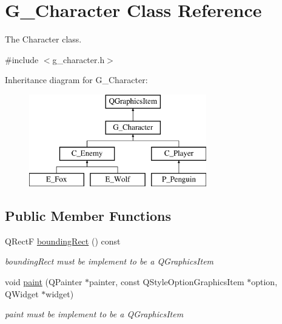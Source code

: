 \hypertarget{class_g___character}{}\section{G\+\_\+\+Character Class Reference}
\label{class_g___character}


The Character class.  




{\ttfamily \#include $<$g\+\_\+character.\+h$>$}

Inheritance diagram for G\+\_\+\+Character\+:\begin{figure}[H]
\begin{center}
\leavevmode
\includegraphics[height=4.000000cm]{class_g___character}
\end{center}
\end{figure}
\subsection*{Public Member Functions}
\begin{DoxyCompactItemize}
\item 
Q\+Rect\+F \hyperlink{class_g___character_a76274fe4d50ce3c5346853eba2009ffc}{bounding\+Rect} () const 
\begin{DoxyCompactList}\small\item\em bounding\+Rect must be implement to be a Q\+Graphics\+Item \end{DoxyCompactList}\item 
void \hyperlink{class_g___character_af66401815405ada4e088447dd6b22d6a}{paint} (Q\+Painter $\ast$painter, const Q\+Style\+Option\+Graphics\+Item $\ast$option, Q\+Widget $\ast$widget)
\begin{DoxyCompactList}\small\item\em paint must be implement to be a Q\+Graphics\+Item \end{DoxyCompactList}\end{DoxyCompactItemize}
